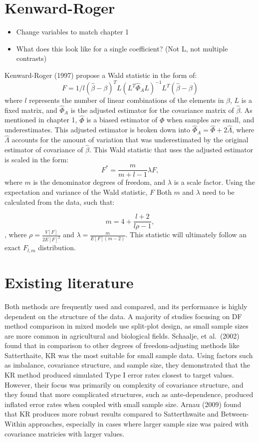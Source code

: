 \documentclass[12pt, twoside]{amherstthesis}
\providecommand{\tightlist}{%
  \setlength{\itemsep}{0pt}\setlength{\parskip}{0pt}}
\begin{document}
\hypertarget{kenward-roger}{%
\section{Kenward-Roger}\label{kenward-roger}}
\begin{itemize}
\tightlist
\item
  Change variables to match chapter 1
\item
  What does this look like for a single coefficient? (Not L, not multiple contrasts)
\end{itemize}
Kenward-Roger (1997) propose a Wald statistic in the form of:
\[F = 1/l(\hat\beta-\beta)^TL(L^T\hat\Phi_A L)^{-1}L^T(\hat\beta-\beta)\] where \(l\) represents the number of linear combinations of the elements in \(\beta\), \(L\) is a fixed matrix, and \(\hat\Phi_A\) is the adjusted estimator for the covariance matrix of \(\hat\beta\). As mentioned in chapter 1, \(\hat\Phi\) is a biased estimator of \(\Phi\) when samples are small, and underestimates. This adjusted estimator is broken down into \(\hat\Phi_A = \hat\Phi + 2\hat\Lambda\), where \(\hat\Lambda\) accounts for the amount of variation that was underestimated by the original estimator of covariance of \(\hat\beta\). This Wald statistic that uses the adjusted estimator is scaled in the form: \[F^* = \frac{m}{m+l-1}\lambda F,\] where \(m\) is the denominator degrees of freedom, and \(\lambda\) is a scale factor. Using the expectation and variance of the Wald statistic, \(F\) Both \(m\) and \(\lambda\) need to be calculated from the data, such that:

\[m = 4 + \frac{l+2}{l\rho-1},\], where \(\rho = \frac{V[F]}{2E[F]^2}\) and
\(\lambda = \frac{m}{E[F](m-2)}\). This statistic will ultimately follow an exact \(F_{l,m}\) distribution.

\hypertarget{existing-literature}{%
\section{Existing literature}\label{existing-literature}}

Both methods are frequently used and compared, and its performance is highly dependent on the structure of the data.
A majority of studies focusing on DF method comparison in mixed models use split-plot design, as small sample sizes are more common in agricultural and biological fields. Schaalje, et al.~(2002) found that in comparison to other degrees of freedom-adjusting methods like Satterthaite, KR was the most suitable for small sample data. Using factors such as imbalance, covariance structure, and sample size, they demonstrated that the KR method produced simulated Type I error rates closest to target values. However, their focus was primarily on complexity of covariance structure, and they found that more complicated structures, such as ante-dependence, produced inflated error rates when coupled with small sample size. Arnau (2009) found that KR produces more robust results compared to Satterthwaite and Between-Within approaches, especially in cases where larger sample size was paired with covariance matricies with larger values.
\end{document}
